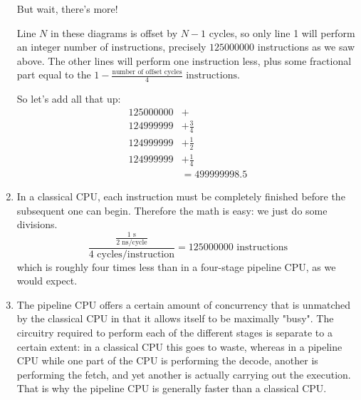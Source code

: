 \documentclass{article}
\begin{document}
\begin{enumerate}
        But wait, there's more!

        Line $N$ in these diagrams is offset by $N-1$ cycles, so only line 1
        will perform an integer number of instructions, precisely $125 000 000$
        instructions as we saw above. The other lines will perform one
        instruction less, plus some fractional part equal to the
        $1 - \frac{\text{number of offset cycles}}{4}\text{ instructions}$.

        So let's add all that up:
        \begin{align*}
            125 000 000 &+ \\
            124 999 999 &+ \frac{3}{4} \\
            124 999 999 &+ \frac{1}{2} \\
            124 999 999 &+ \frac{1}{4} \\
                        &= 499 999 998.5
        \end{align*}

    \item In a classical CPU, each instruction must be completely finished
        before the subsequent one can begin. Therefore the math is easy: we just do some divisions.
        \begin{equation*}
            \frac{\frac{1\text{ s}}{2 \text{ ns/cycle}}}{4\text{ cycles/instruction}} 
                =  125 000 000\text{ instructions}
        \end{equation*}
        which is roughly four times less than in a four-stage pipeline CPU, as we would expect.

    \item The pipeline CPU offers a certain amount of concurrency that is
        unmatched by the classical CPU in that it allows itself to be maximally
        "busy". The circuitry required to perform each of the different stages
        is separate to a certain extent: in a classical CPU this goes to waste,
        whereas in a pipeline CPU while one part of the CPU is performing the
        decode, another is performing the fetch, and yet another is actually
        carrying out the execution. That is why the pipeline CPU is generally
        faster than a classical CPU.


\end{enumerate}
\end{document}
